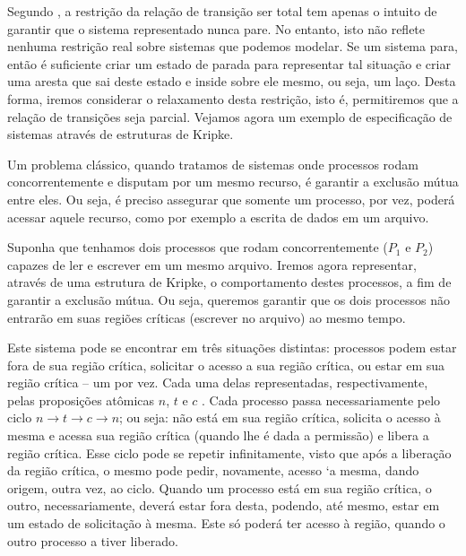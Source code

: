 \documentclass[normaltoc,capchap,capsec,times]{abnt}
\begin{document}
Segundo \cite{huth}, a restrição da relação de transição ser total tem apenas o intuito de garantir que o sistema representado nunca pare. No entanto, isto não reflete nenhuma restrição real sobre sistemas que podemos modelar. Se um sistema para, então é suficiente criar um estado de parada  para representar tal situação e criar uma aresta que sai deste estado e inside sobre  ele mesmo, ou seja, um laço. Desta forma, iremos considerar o relaxamento desta restrição, isto é, permitiremos que a relação de transições seja parcial. Vejamos agora um exemplo de especificação de sistemas através de estruturas de Kripke. 

Um problema clássico, quando tratamos de sistemas onde processos rodam concorrentemente e disputam por um mesmo recurso, é garantir a exclusão mútua entre eles. Ou seja, é preciso assegurar que somente um processo, por vez, poderá acessar aquele recurso, como por exemplo a escrita de dados em um arquivo.

Suponha que tenhamos dois processos que rodam concorrentemente ($P_1$ e $P_2$) capazes de ler e escrever em um mesmo arquivo. Iremos agora representar, através de uma estrutura de Kripke, o comportamento destes processos, a fim de garantir a exclusão mútua. Ou seja, queremos garantir que os dois processos não entrarão em suas regiões críticas (escrever no arquivo) ao mesmo tempo. 

Este sistema pode se encontrar em três situações distintas: processos podem estar fora de sua região crítica, solicitar o acesso a sua região crítica, ou estar em sua região crítica -- um por vez. Cada uma delas representadas, respectivamente, pelas proposições atômicas $n$, $t$ e $c$ . Cada processo passa necessariamente pelo ciclo $n \to t \to c \to n$; ou seja: não está em sua região crítica, solicita o acesso à mesma e acessa sua região crítica (quando lhe é dada a permissão) e libera a região crítica. Esse ciclo pode se repetir infinitamente, visto que após a liberação da região crítica, o mesmo pode pedir, novamente, acesso `a mesma, dando origem, outra vez, ao ciclo. Quando um processo está em sua região crítica, o outro, necessariamente, deverá estar fora desta, podendo, até mesmo, estar em um estado de solicitação à mesma. Este só poderá ter acesso à região, quando o outro processo a tiver liberado.\cite{huth}
\end{document}
